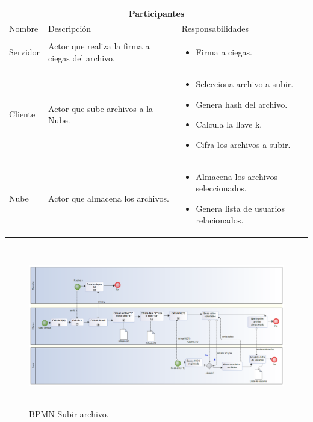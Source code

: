 \begin{tabular}{ |p{2cm}|p{6cm}|p{6cm}|  }
\hline
\multicolumn{3}{|c|}{  Participantes  } \\
\hline

{ Nombre }  & { Descripción } & { Responsabilidades} \\
\hline
{ Servidor } &  Actor que realiza la firma a ciegas del archivo.  &  
			\begin{itemize}	
				\item Firma a ciegas.

			\end{itemize}   \\ 
\hline
{ Cliente } &   Actor que sube archivos a la Nube.  &  
			\begin{itemize}	
				\item Selecciona archivo a subir.
				\item Genera hash del archivo. 
				\item Calcula la llave k.
				\item Cifra los archivos a subir.
			\end{itemize}   \\ 
\hline
{ Nube } &   Actor que almacena los archivos.  &  
			\begin{itemize}	
				\item Almacena los archivos seleccionados.
				\item Genera lista de usuarios relacionados.
			\end{itemize}   \\ 
\hline
\end{tabular}


\begin{figure}[H]
\centering
	\includegraphics[width=17cm, height=7cm]{./images/BPM_Subir.png}
	\caption{BPMN Subir archivo.}

\end{figure}



